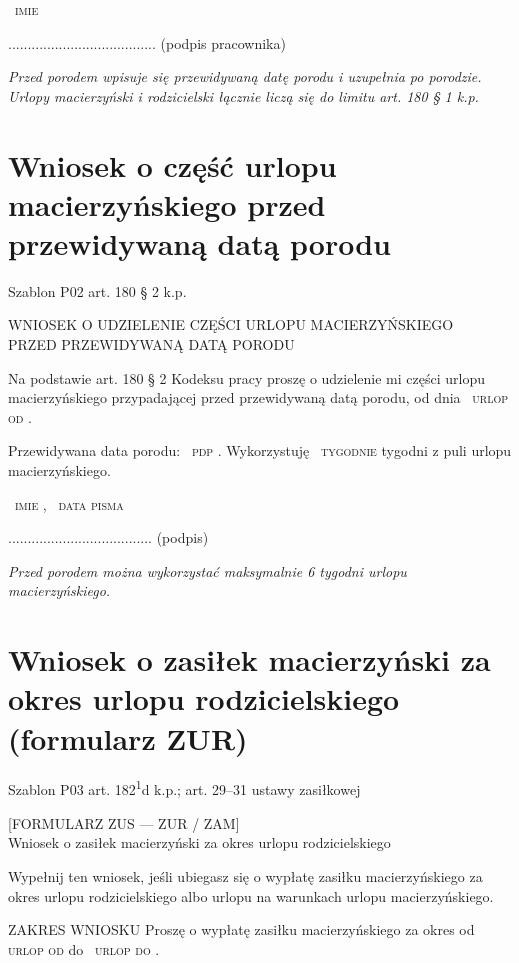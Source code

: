 \documentclass[11pt,a4paper]{article}
\newcommand{\Pole}[1]{%
  \textcolor{szary}{\dotfill}\,%
  {\scriptsize\textcolor{szary}{\textsc{#1}}}%
}
\begin{document}
\Pole{imie}
......................................
(podpis pracownika)

\vfill
{\footnotesize\color{szary}\itshape Przed porodem wpisuje się przewidywaną datę porodu i uzupełnia po porodzie. Urlopy macierzyński i rodzicielski łącznie liczą się do limitu art. 180 \S{} 1 k.p. }

\clearpage

\section{Wniosek o część urlopu macierzyńskiego przed przewidywaną datą porodu}

{\small\color{szary}Szablon P02 \textbullet{} art. 180 \S{} 2 k.p.}

WNIOSEK O UDZIELENIE CZĘŚCI URLOPU MACIERZYŃSKIEGO\\[-2pt]
PRZED PRZEWIDYWANĄ DATĄ PORODU

Na podstawie art. 180 \S{} 2 Kodeksu pracy proszę o udzielenie mi części urlopu
macierzyńskiego przypadającej przed przewidywaną datą porodu, od dnia \Pole{urlop od}.

Przewidywana data porodu: \Pole{pdp}.
Wykorzystuję \Pole{tygodnie} tygodni z puli urlopu macierzyńskiego.

\Pole{imie}, \Pole{data pisma}
.....................................
(podpis)

\vfill
{\footnotesize\color{szary}\itshape Przed porodem można wykorzystać maksymalnie 6 tygodni urlopu macierzyńskiego.}

\clearpage

\section{Wniosek o zasiłek macierzyński za okres urlopu rodzicielskiego (formularz ZUR)}

{\small\color{szary}Szablon P03 \textbullet{} art. 182\textsuperscript{1}d k.p.; art. 29--31 ustawy zasiłkowej}

[FORMULARZ ZUS --- ZUR / ZAM]\\[-2pt]
Wniosek o zasiłek macierzyński za okres urlopu rodzicielskiego

Wypełnij ten wniosek, jeśli ubiegasz się o wypłatę zasiłku macierzyńskiego
za okres urlopu rodzicielskiego albo urlopu na warunkach urlopu macierzyńskiego.

ZAKRES WNIOSKU
Proszę o wypłatę zasiłku macierzyńskiego za okres od \Pole{urlop od} do \Pole{urlop do}.
\end{document}
